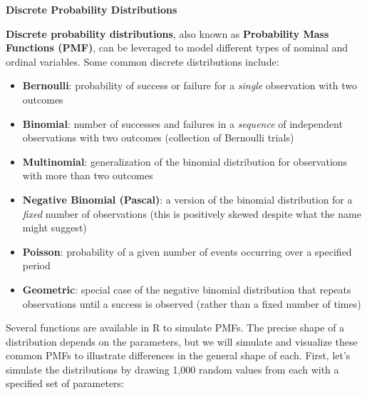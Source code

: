 \documentclass[
]{book}
\providecommand{\tightlist}{%
  \setlength{\itemsep}{0pt}\setlength{\parskip}{0pt}}
\begin{document}
\textbf{Discrete Probability Distributions}

\textbf{Discrete probability distributions}, also known as \textbf{Probability Mass Functions (PMF)}, can be leveraged to model different types of nominal and ordinal variables. Some common discrete distributions include:

\begin{itemize}
\tightlist
\item
  \textbf{Bernoulli}: probability of success or failure for a \emph{single} observation with two outcomes
\item
  \textbf{Binomial}: number of successes and failures in a \emph{sequence} of independent observations with two outcomes (collection of Bernoulli trials)
\item
  \textbf{Multinomial}: generalization of the binomial distribution for observations with more than two outcomes
\item
  \textbf{Negative Binomial (Pascal)}: a version of the binomial distribution for a \emph{fixed} number of observations (this is positively skewed despite what the name might suggest)
\item
  \textbf{Poisson}: probability of a given number of events occurring over a specified period
\item
  \textbf{Geometric}: special case of the negative binomial distribution that repeats observations until a success is observed (rather than a fixed number of times)
\end{itemize}

Several functions are available in R to simulate PMFs. The precise shape of a distribution depends on the parameters, but we will simulate and visualize these common PMFs to illustrate differences in the general shape of each. First, let's simulate the distributions by drawing 1,000 random values from each with a specified set of parameters:
\end{document}
